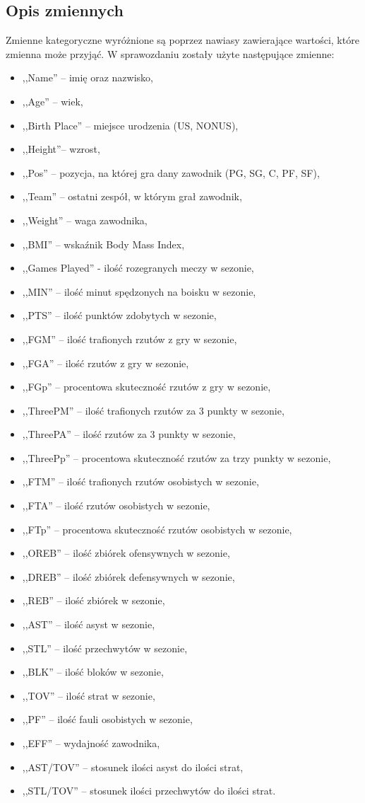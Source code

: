 \documentclass[11pt,a4paper]{article}
\begin{document}
\subsection{Opis zmiennych}
Zmienne kategoryczne wyróżnione są poprzez nawiasy zawierające wartości, które zmienna może przyjąć. W sprawozdaniu zostały użyte następujące zmienne:
\begin{itemize}
	\item ,,Name'' -- imię oraz nazwisko,
	\item ,,Age'' -- wiek,
	\item ,,Birth Place'' -- miejsce urodzenia (US, NONUS),
	\item ,,Height''-- wzrost,
	\item ,,Pos'' -- pozycja, na której gra dany zawodnik (PG, SG, C, PF, SF),
	\item ,,Team'' -- ostatni zespół, w którym grał zawodnik,
	\item ,,Weight'' -- waga zawodnika,	
	\item ,,BMI'' -- wskaźnik Body Mass Index, 
	\item ,,Games Played'' - ilość rozegranych meczy w sezonie,	
	\item ,,MIN'' -- ilość minut spędzonych na boisku w sezonie,
	\item ,,PTS'' -- ilość punktów zdobytych w sezonie,
	\item ,,FGM'' -- ilość trafionych rzutów z gry w sezonie,
	\item ,,FGA'' -- ilość rzutów z gry w sezonie,
	\item ,,FGp'' -- procentowa skuteczność rzutów z gry w sezonie,
	\item ,,ThreePM'' -- ilość trafionych rzutów za 3 punkty w sezonie,
	\item ,,ThreePA'' -- ilość rzutów za 3 punkty w sezonie,
	\item ,,ThreePp'' -- procentowa skuteczność rzutów za trzy punkty w sezonie,
	\item ,,FTM'' -- ilość trafionych rzutów osobistych w sezonie,
	\item ,,FTA'' -- ilość rzutów osobistych w sezonie,
	\item ,,FTp'' -- procentowa skuteczność rzutów osobistych w sezonie,
	\item ,,OREB'' -- ilość zbiórek ofensywnych w sezonie,	
	\item ,,DREB'' -- ilość zbiórek defensywnych w sezonie,	
	\item ,,REB'' -- ilość zbiórek w sezonie,
	\item ,,AST'' -- ilość asyst w sezonie,
	\item ,,STL'' -- ilość przechwytów w sezonie,
	\item ,,BLK'' -- ilość bloków w sezonie,
	\item ,,TOV'' -- ilość strat w sezonie,
	\item ,,PF'' -- ilość fauli osobistych w sezonie,
	\item ,,EFF'' -- wydajność zawodnika,
	\item ,,AST/TOV'' -- stosunek ilości asyst do ilości strat,
	\item ,,STL/TOV'' -- stosunek ilości przechwytów do ilości strat.
\end{itemize}
\end{document}
